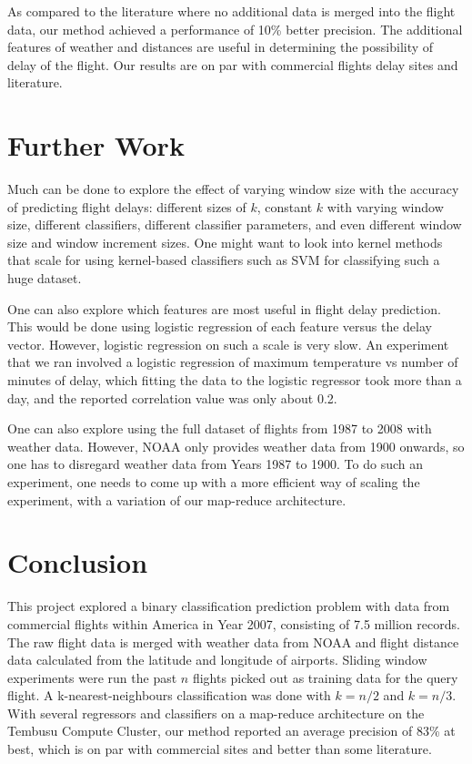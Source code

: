 \documentclass[letterpaper,11pt]{article}
\begin{document}
As compared to the literature where no additional data is merged into the flight data, our method achieved a performance of 10\% better precision. The additional features of weather and distances are useful in determining the possibility of delay of the flight. Our results are on par with commercial flights delay sites and literature. 

\section{Further Work}
Much can be done to explore the effect of varying window size with the accuracy of predicting flight delays: different sizes of $k$, constant $k$ with varying window size, different classifiers, different classifier parameters, and even different window size and window increment sizes. One might want to look into kernel methods that scale for using kernel-based classifiers such as SVM for classifying such a huge dataset. 

One can also explore which features are most useful in flight delay prediction. This would be done using logistic regression of each feature versus the delay vector. However, logistic regression on such a scale is very slow. An experiment that we ran involved a logistic regression of maximum temperature vs number of minutes of delay, which fitting the data to the logistic regressor took more than a day, and the reported correlation value was only about 0.2. 

One can also explore using the full dataset of flights from 1987 to 2008 with weather data. However, NOAA only provides weather data from 1900 onwards, so one has to disregard weather data from Years 1987 to 1900. To do such an experiment, one needs to come up with a more efficient way of scaling the experiment, with a variation of our map-reduce architecture.

\section{Conclusion}
This project explored a binary classification prediction problem with data from commercial flights within America in Year 2007, consisting of 7.5 million records. The raw flight data is merged with weather data from NOAA and flight distance data calculated from the latitude and longitude of airports. Sliding window experiments were run the past $n$ flights picked out as training data for the query flight. A k-nearest-neighbours classification was done with $k=n/2$ and $k=n/3$. With several regressors and classifiers on a map-reduce architecture on the Tembusu Compute Cluster, our method reported an average precision of 83\% at best, which is on par with commercial sites and better than some literature. 



\end{document}
